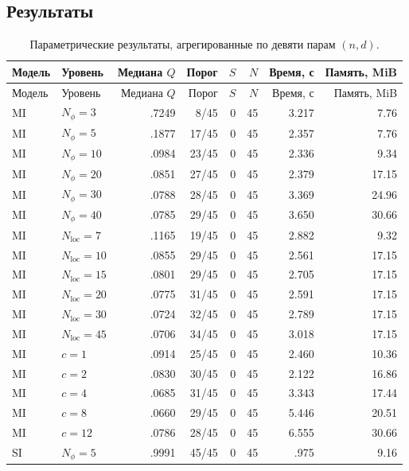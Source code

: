 \documentclass[11pt,a4paper]{article}
\begin{document}
\subsection{Результаты}

\begin{longtable}{llrrrrrr}
\caption{Параметрические результаты, агрегированные по девяти парам $(n,d)$.}
\label{tab:param-results}\\
\toprule
Модель & Уровень & Медиана $Q$ & Порог & $S$ & $N$ & Время, с & Память, MiB \\
\midrule
\endfirsthead
\toprule
Модель & Уровень & Медиана $Q$ & Порог & $S$ & $N$ & Время, с & Память, MiB \\
\midrule
\endhead
MI & $N_\phi=3$  & .7249 & 8/45  & 0 & 45 & 3.217 & 7.76 \\
MI & $N_\phi=5$  & .1877 & 17/45 & 0 & 45 & 2.357 & 7.76 \\
MI & $N_\phi=10$ & .0984 & 23/45 & 0 & 45 & 2.336 & 9.34 \\
MI & $N_\phi=20$ & .0851 & 27/45 & 0 & 45 & 2.379 & 17.15 \\
MI & $N_\phi=30$ & .0788 & 28/45 & 0 & 45 & 3.369 & 24.96 \\
MI & $N_\phi=40$ & .0785 & 29/45 & 0 & 45 & 3.650 & 30.66 \\
\midrule
MI & $N_{\mathrm{loc}}=7$  & .1165 & 19/45 & 0 & 45 & 2.882 & 9.32 \\
MI & $N_{\mathrm{loc}}=10$ & .0855 & 29/45 & 0 & 45 & 2.561 & 17.15 \\
MI & $N_{\mathrm{loc}}=15$ & .0801 & 29/45 & 0 & 45 & 2.705 & 17.15 \\
MI & $N_{\mathrm{loc}}=20$ & .0775 & 31/45 & 0 & 45 & 2.591 & 17.15 \\
MI & $N_{\mathrm{loc}}=30$ & .0724 & 32/45 & 0 & 45 & 2.789 & 17.15 \\
MI & $N_{\mathrm{loc}}=45$ & .0706 & 34/45 & 0 & 45 & 3.018 & 17.15 \\
\midrule
MI & $c=1$  & .0914 & 25/45 & 0 & 45 & 2.460 & 10.36 \\
MI & $c=2$  & .0830 & 30/45 & 0 & 45 & 2.122 & 16.86 \\
MI & $c=4$  & .0685 & 31/45 & 0 & 45 & 3.343 & 17.44 \\
MI & $c=8$  & .0660 & 29/45 & 0 & 45 & 5.446 & 20.51 \\
MI & $c=12$ & .0786 & 28/45 & 0 & 45 & 6.555 & 30.66 \\
\midrule
SI & $N_\phi=5$  & .9991 & 45/45 & 0  & 45 & .975 & 9.16 \\

\end{longtable}
\end{document}
